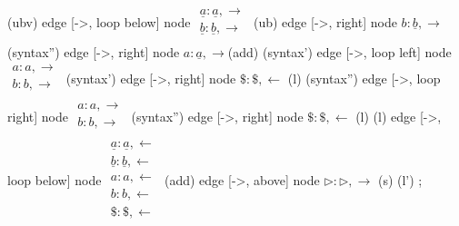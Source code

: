 \documentclass{article}
\newcommand{\la}{\leftarrow}
\newcommand{\ra}{\rightarrow}
\newcommand{\s}{\rhd}
\renewcommand{\u}{\underline}
\begin{document}
{        (ubv)
            edge [->, loop below] node {$\begin{array}{l}
                                            \u{a} : \u{a}, \ra\\
                                            \u{b} : \u{b}, \ra\\
                                        \end{array}$} (ub)
            edge [->, right] node {$b:\u{b}, \ra$}(syntax'')
            edge [->, right] node {$a:\u{a}, \ra$}(add)
        (syntax')
            edge [->, loop left] node {$\begin{array}{l}
                                            a : a, \ra\\
                                            b : b, \ra\\
                                        \end{array}$} (syntax')
            edge [->, right] node {$\$: \$, \la$} (l)
        (syntax'')
            edge [->, loop right] node {$\begin{array}{l}
                                            a : a, \ra\\
                                            b : b, \ra\\
                                        \end{array}$} (syntax'')
            edge [->, right] node {$\$: \$, \la$} (l)
        (l)
            edge [->, loop below] node {$\begin{array}{l}
                                            \u{a} : \u{a}, \la\\
                                            \u{b} : \u{b}, \la\\
                                            a : a, \la\\
                                            b : b, \la\\
                                            \$ : \$, \la\\
                                        \end{array}$} (add)
            edge [->, above] node {$\s : \s, \ra$} (s)
        (l')
    ;}\\
\end{document}
